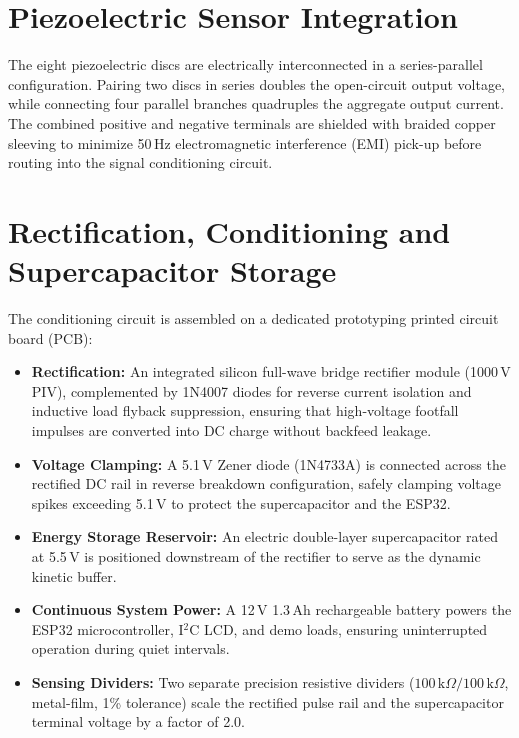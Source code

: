 \section{Piezoelectric Sensor Integration}
The eight piezoelectric discs are electrically interconnected in a series-parallel configuration. Pairing two discs in series doubles the open-circuit output voltage, while connecting four parallel branches quadruples the aggregate output current. The combined positive and negative terminals are shielded with braided copper sleeving to minimize 50\,Hz electromagnetic interference (EMI) pick-up before routing into the signal conditioning circuit.

\section{Rectification, Conditioning and Supercapacitor Storage}
The conditioning circuit is assembled on a dedicated prototyping printed circuit board (PCB):
\begin{itemize}
    \item \textbf{Rectification:} An integrated silicon full-wave bridge rectifier module (1000\,V PIV), complemented by 1N4007 diodes for reverse current isolation and inductive load flyback suppression, ensuring that high-voltage footfall impulses are converted into DC charge without backfeed leakage.
    \item \textbf{Voltage Clamping:} A 5.1\,V Zener diode (1N4733A) is connected across the rectified DC rail in reverse breakdown configuration, safely clamping voltage spikes exceeding 5.1\,V to protect the supercapacitor and the ESP32.
    \item \textbf{Energy Storage Reservoir:} An electric double-layer supercapacitor rated at 5.5\,V is positioned downstream of the rectifier to serve as the dynamic kinetic buffer.
    \item \textbf{Continuous System Power:} A 12\,V 1.3\,Ah rechargeable battery powers the ESP32 microcontroller, I$^2$C LCD, and demo loads, ensuring uninterrupted operation during quiet intervals.
    \item \textbf{Sensing Dividers:} Two separate precision resistive dividers ($100\,\text{k}\Omega / 100\,\text{k}\Omega$, metal-film, 1\% tolerance) scale the rectified pulse rail and the supercapacitor terminal voltage by a factor of 2.0.
\end{itemize}

